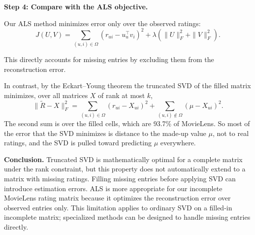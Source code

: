 \textbf{Step 4: Compare with the ALS objective.}

Our ALS method minimizes error only over the observed
ratings:
\[
J(U,V)=
\sum_{(u,i)\in\Omega}
(r_{ui}-u_u^\top v_i)^2
+\lambda(\|U\|_F^2+\|V\|_F^2).
\]

This directly accounts for missing entries by excluding
them from the reconstruction error.

In contrast, by the Eckart--Young theorem the truncated SVD of
the filled matrix minimizes, over all matrices $X$ of rank at
most $k$,
\[
\|\widetilde R-X\|_F^2
=\sum_{(u,i)\in\Omega}(r_{ui}-X_{ui})^2
+\sum_{(u,i)\notin\Omega}(\mu-X_{ui})^2 .
\]
The second sum is over the filled cells, which are 93.7\% of
MovieLens. So most of the error that the SVD minimizes is
distance to the made-up value $\mu$, not to real ratings, and
the SVD is pulled toward predicting $\mu$ everywhere.

\textbf{Conclusion.} Truncated SVD is mathematically
optimal for a complete matrix under the rank constraint,
but this property does not automatically extend to a
matrix with missing ratings. Filling missing entries
before applying SVD can introduce estimation errors.
ALS is more appropriate for our incomplete MovieLens
rating matrix because it optimizes the reconstruction
error over observed entries only. This limitation applies
to ordinary SVD on a filled-in incomplete matrix; specialized
methods can be designed to handle missing entries directly.
